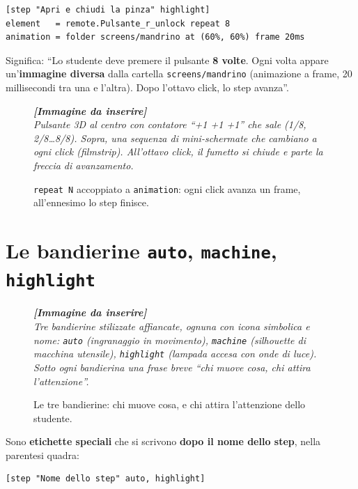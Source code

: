 ﻿\documentclass[a4paper,12pt,oneside]{book}
\newcommand{\imgph}[2]{%
  \begin{tcolorbox}[colback=cvtlightblue!30,colframe=cvtblue!40,%
    width=#1,halign=center,valign=center,height=5cm,boxrule=0.5pt,arc=3pt]%
    \textcolor{cvtgray}{\itshape\footnotesize\textbf{[Immagine da inserire]}\\[3pt]#2}%
  \end{tcolorbox}}
\begin{document}
\begin{lstlisting}
[step "Apri e chiudi la pinza" highlight]
element   = remote.Pulsante_r_unlock repeat 8
animation = folder screens/mandrino at (60%, 60%) frame 20ms
\end{lstlisting}

Significa: ``Lo studente deve premere il pulsante \textbf{8 volte}. Ogni volta
appare un'\textbf{immagine diversa} dalla cartella \texttt{screens/mandrino}
(animazione a frame, 20 millisecondi tra una e l'altra). Dopo l'ottavo click,
lo step avanza''.

\begin{figure}[H]
  \centering
  \imgph{12cm}{Pulsante 3D al centro con contatore ``+1 +1 +1'' che sale (1/8, 2/8\ldots 8/8). Sopra, una sequenza di mini-schermate che cambiano a ogni click (filmstrip). All'ottavo click, il fumetto si chiude e parte la freccia di avanzamento.}
  \caption{\texttt{repeat N} accoppiato a \texttt{animation}: ogni click avanza un frame, all'ennesimo lo step finisce.}
  \label{fig:repeat-animation}
\end{figure}

\chapter{Le bandierine \texttt{auto}, \texttt{machine}, \texttt{highlight}}
\label{ch:bandierine}

\begin{figure}[H]
  \centering
  \imgph{12cm}{Tre bandierine stilizzate affiancate, ognuna con icona simbolica e nome: \texttt{auto} (ingranaggio in movimento), \texttt{machine} (silhouette di macchina utensile), \texttt{highlight} (lampada accesa con onde di luce). Sotto ogni bandierina una frase breve ``chi muove cosa, chi attira l'attenzione''.}
  \caption{Le tre bandierine: chi muove cosa, e chi attira l'attenzione dello studente.}
  \label{fig:tre-bandierine}
\end{figure}

Sono \textbf{etichette speciali} che si scrivono \textbf{dopo il nome dello step},
nella parentesi quadra:

\begin{lstlisting}
[step "Nome dello step" auto, highlight]
\end{lstlisting}
\end{document}
